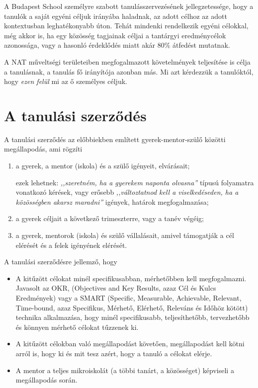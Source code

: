 A Budapest School személyre szabott tanulásszervezésének jellegzetessége, hogy a tanulók a saját egyéni céljuk irányába haladnak, az adott célhoz az adott kontextusban leghatékonyabb úton. Tehát mindenki rendelkezik egyéni célokkal, még akkor is, ha egy közösség tagjainak céljai a tantárgyi eredménycélok azonossága, vagy a hasonló érdeklődés miatt akár  80\% átfedést mutatnak.

A NAT műveltségi területeiben megfogalmazott követelmények teljesítése is célja a tanulásnak, a tanulás fő irányítója azonban más. Mi azt kérdezzük a tanulóktól, hogy \emph{ezen felül} mi az ő személyes céljuk.

\section{A tanulási szerződés}


A tanulási szerződés az előbbiekben említett gyerek-mentor-szülő közötti megállapodás, ami rögzíti
\begin{enumerate}
\item a gyerek, a mentor (iskola) és a szülő igényeit, elvárásait;

    ezek lehetnek: \emph{,,szeretném, ha a gyerekem naponta olvasna''} típusú folyamatra vonatkozó kérések, vagy erősebb \emph{,,változtatnod kell a viselkedéseden, ha a közösségben akarsz maradni''} igények, határok megfogalmazása;

\item a gyerek céljait a következő trimeszterre, vagy a tanév végéig;

\item a gyerek, mentorok (iskola) és szülő vállalásait, amivel támogatják a cél elérését és a felek igényének elérését.

\end{enumerate}

A tanulási szerződésre jellemző, hogy
\begin{itemize}
\item A kitűzött célokat minél specifikusabban, mérhetőbben kell megfogalmazni. Javasolt az OKR,  (Objectives and Key Results, azaz  Cél és Kulcs Eredmények) \citep{okr} vagy a SMART (Specific, Measurable, Achievable, Relevant, Time-bound, azaz Specifikus,  Mérhető, Elérhető, Releváns és Időhöz kötött) \citep{wiki:smart} technika alkalmazása, hogy minél specifikusabb, teljesíthetőbb, tervezhetőbb és könnyen mérhető célokat tűzzenek ki.

\item A kitűzött célokban való megállapodást követően, megállapodást  kell kötni arról is, hogy ki és mit tesz azért, hogy a tanuló a célokat elérje.

\item A mentor a teljes mikroiskolát (a többi tanárt, a közösséget) képviseli a megállapodás során.
\end{itemize}

